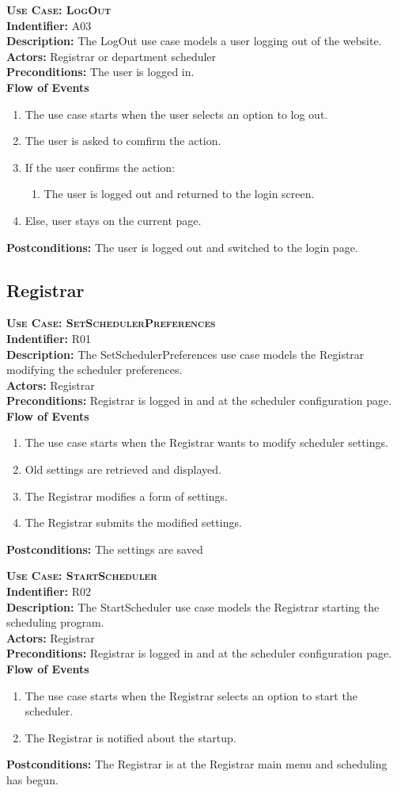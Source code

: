 \documentclass[11pt]{article}
\newenvironment{usecase}{%
	\def\title##1{ {\large \bfseries  \scshape {Use Case:} ##1} \\ }
 	\def\id##1{{\bf Indentifier:} ##1\\}
	\def\des##1{ {\bf Description:} ##1\\}
	\def\actors##1{ {\bf Actors:} ##1\\}
    	\def\pre##1{ {\bf Preconditions:} ##1 \\} %
    	\def\flow##1{ {\bf Flow of Events} ##1}%
    	\newenvironment{ucenum}{%
        	\begin{enumerate}[nolistsep]\small}%
        	{\end{enumerate}}
	\def\post##1{ {\bf Postconditions:} ##1 \\}
}{\vspace{.05in}}
\begin{document}
\begin{usecase}
  \title{LogOut}
  \id{A03}
  \des{The LogOut use case models a user logging out of the website.}
  \actors{Registrar or department scheduler}
  \pre{The user is logged in.}
  \flow{}
  \begin{ucenum}
  \item The use case starts when the user selects an option to log out.
  \item The user is asked to comfirm the action.
  \item If the user confirms the action:
    \begin{ucenum}
    \item The user is logged out and returned to the login screen.
    \end{ucenum}
  \item Else, user stays on the current page.
  \end{ucenum}
  \post{The user is logged out and switched to the login page.}
\end{usecase}

\subsection{Registrar}
\begin{usecase}
  \title{SetSchedulerPreferences}
  \id{R01}
  \des{The SetSchedulerPreferences use case models the Registrar modifying the scheduler preferences.}
  \actors{Registrar}
  \pre{Registrar is logged in and at the scheduler configuration page.}
  \flow{}
  \begin{ucenum}
  \item The use case starts when the Registrar wants to modify scheduler settings.
  \item Old settings are retrieved and displayed.
  \item The Registrar modifies a form of settings.
  \item The Registrar submits the modified settings.
  \end{ucenum}
  \post{The settings are saved}
\end{usecase}

\begin{usecase}
  \title{StartScheduler}
  \id{R02}
  \des{The StartScheduler use case models the Registrar starting the scheduling program.}
  \actors{Registrar}
  \pre{Registrar is logged in and at the scheduler configuration page.}
  \flow{}
  \begin{ucenum}
  \item The use case starts when the Registrar selects an option to start the scheduler.
  \item The Registrar is notified about the startup.
  \end{ucenum}
  \post{The Registrar is at the Registrar main menu and scheduling has begun.}
\end{usecase}
\end{document}
